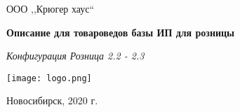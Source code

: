 \begin{titlepage}
\begin{center}
\large
ООО  ,,Крюгер хаус``


\vspace{2.25cm}

\textbf{Описание для товароведов базы ИП для розницы}

\textit{Конфигурация Розница 2.2 - 2.3}
\vfill

{\texttt{[image: logo.png]}}

\end{center}
\vfill

\newlength{\ML}


\begin{center}
Новосибирск, 2020 г.
\end{center}
\end{titlepage}